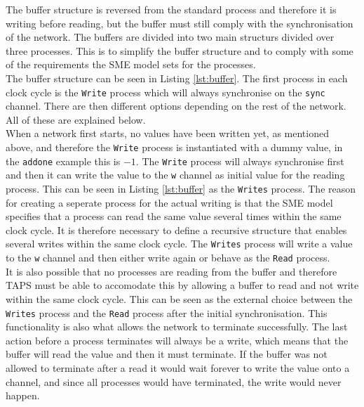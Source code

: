 The buffer structure is reversed from the standard process and therefore it is writing before reading, but the buffer must still comply with the synchronisation of the network.
The buffers are divided into two main structurs divided over three processes. This is to simplify the buffer structure and to comply with some of the requirements the SME model sets for the processes. \\

The buffer structure can be seen in Listing \ref{lst:buffer}. The first process in each clock cycle is the \texttt{Write} process which will always synchronise on the \texttt{sync} channel. There are then different options depending on the rest of the network. All of these are explained below.\\

When a network first starts, no values have been written yet, as mentioned above, and therefore the \texttt{Write} process is instantiated with a dummy value, in the \texttt{addone} example this is $-1$. The \texttt{Write} process will always synchronise first and then it can write the value to the \texttt{w} channel as initial value for the reading process. This can be seen in Listing \ref{lst:buffer} as the \texttt{Writes} process. The reason for creating a seperate process for the actual writing is that the SME model specifies that a process %
can read the same value several times within the same clock cycle. It is therefore necessary to define a recursive structure that enables several writes within the same clock cycle. The \texttt{Writes} process will write a value to the \texttt{w} channel and then either write again or behave as the \texttt{Read} process.\\

It is also possible that no processes are reading from the buffer and therefore TAPS must be able to accomodate this by allowing a buffer to read and not write within the same clock cycle. This can be seen as the external choice between the \texttt{Writes} process and the \texttt{Read} process after the initial synchronisation. This functionality is also what allows the network to terminate successfully.
The last action before a process terminates will always %
be a write, which means that the buffer will read the value and then it must terminate. If the buffer was not allowed to terminate after a read it would wait forever to write the value onto a channel, and since all processes would have terminated, the write would never happen.\\

